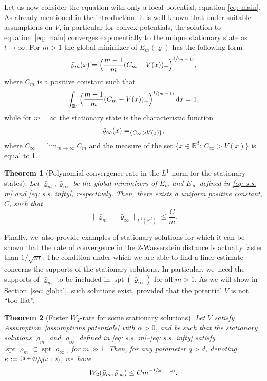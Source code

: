 \documentclass[11pt]{article}
\makeatletter
\numberwithin{equation}{section}
\newcommand{\psfrac}[2]{\sfrac{(#1)}{#2}}
\newcommand{\spfrac}[2]{\sfrac{#1}{(#2)}}
\DeclareMathOperator{\spt}{spt}
\DeclareRobustCommand{\mathbbm}[1]{\csname jepbb@#1\endcsname}
\let\mathds\mathbbm
\newcommand{\Bprt}[1]{\Bigl(#1\Bigr)}
\newcommand{\dx}[1]{\mathop{}\!\mathrm{d} #1}
\newcommand{\R}{\mathbb{R}}
\theoremstyle{plain}
\newtheorem{theorem}{Theorem}[section]
\theoremstyle{remark}
\makeatother
\begin{document}
Let us now consider the equation with only a local potential, equation \eqref{eq: main}. As already mentioned in the introduction, it is well known that under suitable assumptions on $V$, in particular for convex potentials, the solution to equation~\eqref{eq: main} converges exponentially to the {unique} stationary state as $t\to\infty$. For $m>1$ the global minimizer of $E_m(\varrho)$ has the following form
\begin{equation}\label{eq: s.s. m}
\bar\varrho_m(x) = \Bprt{\frac{m-1}{m}(C_m - V(x))_+}^{\spfrac{1}{m-1}},
\end{equation}
where $C_m$ is a positive constant such that
\[
\int_{\R^d} \Bprt{\frac{m-1}{m}(C_m - V(x))_+}^{\spfrac{1}{m-1}} \dx x =1,
\]
while for $m=\infty$ the stationary state is the characteristic function
\begin{equation}\label{eq: s.s. infty}
\bar\varrho_\infty(x)=\mathds{1}_{\{C_\infty > V(x)\}},
\end{equation}
where $C_\infty=\lim_{m\to\infty}C_m$ and the measure of the set $\{x\in\R^d: \ C_\infty>V(x)\}$ is equal to 1.

\begin{theorem}[Polynomial {convergence} rate in the $L^1$-norm for the stationary states]\label{thm: L1 s.s.}
Let $\bar\varrho_m, \bar\varrho_\infty$ be the global minimizers of $E_m$ and $E_\infty$ defined in \eqref{eq: s.s. m} and \eqref{eq: s.s. infty}, respectively. Then, there exists a uniform positive constant, $C$, such that
\begin{equation*}
\|\bar\varrho_m- \bar\varrho_\infty\|_{L^1(\R^d)} \leq \frac{C}{{m}}.
\end{equation*}
\end{theorem}

Finally, we~also provide examples of stationary solutions for which it can be shown that the rate of convergence in the $2$-Wasserstein distance is actually faster than $1/\sqrt m$. The condition under which we are able to find a finer estimate concerns the supports of the stationary solutions. In particular, we~need the supports of $\bar\varrho_m$ to be included in $\spt (\bar\varrho_\infty)$ for all $m>1$. As we will show in Section~\ref{sec: global}, such solutions exist, provided that the potential $V$ is not ``too flat''.

\begin{theorem}[Faster $W_2$-rate for some stationary solutions]\label{prop: s.s. improved}
Let $V$ satisfy Assumption~\ref{assumptions potentials} with $\alpha>0$, and be such that the stationary solutions $\bar\varrho_m$ and $\bar\varrho_\infty$ defined in \eqref{eq: s.s. m}--\eqref{eq: s.s. infty} satisfy $\spt{\bar\varrho_m}\subset \spt{\bar\varrho_\infty}$, for $m\gg 1$. Then, for any parameter $q>d$, denoting $\kappa := \psfrac{d+q}{q(d+2)}$, we~have
\begin{equation}\label{eq: improved}
W_2(\bar\varrho_m,\bar\varrho_\infty) \leq {C}{m^{-\sfrac{1}{2(1-\kappa)}}}.
\end{equation}
\end{theorem}
\end{document}
